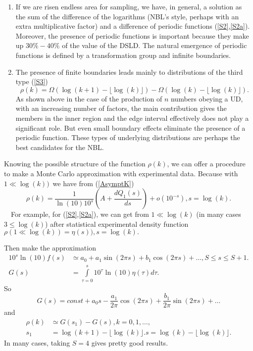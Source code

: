 \documentclass[titlepage,fleqn]{article}%
\begin{document}
\begin{enumerate}
\item If we are risen endless area for sampling, we have, in general, a
solution as the sum of the difference of the logarithms (NBL's style, perhaps
with an extra multiplicative factor) and a difference of periodic functions
(\ref{S2},\ref{S2a}). Moreover, the presence of periodic functions is
important because they make up $30\%-40\%$ of the value of the DSLD. The
natural emergence of periodic functions is defined by a transformation group
and infinite boundaries.

\item The presence of finite boundaries leads mainly to distributions of the
third type (\ref{S3})%
\begin{equation}
\rho(k)=\Omega(\log(k+1)-\lfloor\log(k)\rfloor)-\Omega(\log(k)-\lfloor
\log(k)\rfloor).
\end{equation}
As shown above in the case of the production of $n$ numbers obeying a UD, with
an increasing number of factors, the main contribution gives the members in
the inner region and the edge interval effectively does not play a significant
role. But even small boundary effects eliminate the presence of a periodic
function. These types of underlying distributions are perhaps the best
candidates for the NBL.
\end{enumerate}

Knowing the possible structure of the function $\rho(k)$, we can offer a
procedure to make a Monte Carlo approximation with experimental data. Because
with $1\ll\log(k))$\ we have from (\ref{AsymptK})%
\[
\rho(k)=\frac{1}{\ln(10)10^{s}}\left(  A+\frac{dQ_{1}(s)}{ds}\right)
+o\left(  10^{-s}\right)  ,s=\log(k).
\]
\ \ For example, for (\ref{S2},\ref{S2a}), we can get from $1\ll\log(k)$ (in
many cases $3\leq\log(k)$) after statistical experimental density function
$\rho(1\ll\log(k))=\eta(s)),s=\log(k).$

Then make the approximation
\begin{align*}
10^{s}\ln(10)f(s)  &  \simeq a_{0}+a_{1}\sin(2\pi s)+b_{1}\cos(2\pi
s)+\ldots,S\leq s\leq S+1.\\
G(s)  &  =%
{\displaystyle\int\limits_{\tau=0}^{s}}
10^{\tau}\ln(10)\eta(\tau)d\tau.
\end{align*}
So%
\[
G(s)=const+a_{0}s-\frac{a_{1}}{2\pi}\cos(2\pi s)+\frac{b_{1}}{2\pi}\sin(2\pi
s)+\ldots
\]
and%
\begin{align*}
\rho(k)  &  \simeq G(s_{1})-G(s),k=0,1,\ldots,\\
s_{1}  &  =\log(k+1)-\lfloor\log(k)\rfloor.s=\log(k)-\lfloor\log(k)\rfloor.
\end{align*}
In many cases, taking $S=4$ gives pretty good results.
\end{document}
